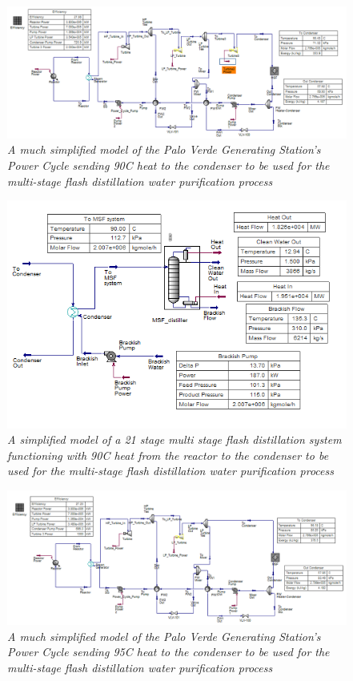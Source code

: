 \documentclass[12pt]{UIdahoMastersThesis}
\begin{document}
\begin{figure}
\includegraphics[width=\textwidth]{90PC.PNG}
\caption{\small \sl A much simplified model of the Palo Verde Generating Station's Power Cycle sending 90\degree C heat to the condenser to be used for the multi-stage flash distillation water purification process}
\end{figure}
\begin{figure}
\includegraphics[width=\textwidth]{90MSF.PNG}
\caption{\small \sl A simplified model of a 21 stage multi stage flash distillation system functioning with 90\degree C heat from the reactor to the condenser to be used for the multi-stage flash distillation water purification process}
\end{figure}
\begin{figure}
\includegraphics[width=\textwidth]{95PC.PNG}
\caption{\small \sl A much simplified model of the Palo Verde Generating Station's Power Cycle sending 95\degree C heat to the condenser to be used for the multi-stage flash distillation water purification process}
\end{figure}
\end{document}
